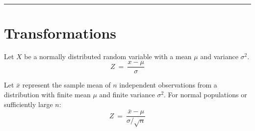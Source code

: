 \documentclass{article}
\newcommand{\HRule}{\rule{\linewidth}{0.25mm}}
\begin{document}
\vspace*{-0.25cm}

\hfill\\
\HRule
\vspace*{-0.250cm}

\section*{Transformations}



Let $X$ be a normally distributed random variable with a mean $\mu$ and variance $\sigma^2$.
\begin{equation*}
        Z	~=~ \frac{\displaystyle x - \mu }{ \displaystyle \sigma}
\end{equation*}



Let $\bar{x}$ represent the sample mean of $n$ independent observations from a distribution with finite mean $\mu$  
and finite variance $\sigma^2$.
For normal populations or sufficiently large $n$:
\begin{equation*}
        Z ~=~ \frac{\displaystyle \bar{x} - \mu }{ \displaystyle \sigma / \sqrt{n}}
\end{equation*}
\end{document}
